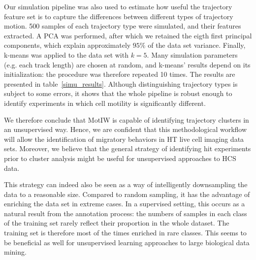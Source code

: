 Our simulation pipeline was also used to estimate how useful the trajectory feature set is to capture the differences between different types of trajectory motion. %
500 samples of each trajectory type were simulated, and their features
extracted. A PCA was performed, after which we retained the eigth
first principal components, which explain approximately $95\%$ of the
data set variance. Finally, k-means was applied to the data set with
$k=5$. Many simulation parameters (e.g. each track length) are chosen
at random, and k-means' results depend on its initialization: the
procedure was therefore repeated 10 times. The results are presented
in table~\ref{simu_results}. Although distinguishing trajectory types
is subject to some errors, it shows that the whole pipeline is robust
enough to identify experiments in which cell motility is significantly
different. 

We therefore conclude that MotIW is capable of identifying trajectory
clusters in an unsupervised way. Hence, we are confident that this
methodological workflow will allow the identification of migratory behaviors in HT live cell imaging data sets. Moreover, we believe that the general strategy of identifying hit experiments prior to cluster analysis
might be useful for unsupervised approaches to HCS data. 

This strategy can indeed also be seen as a way of intelligently downsampling the data to a reasonable size. Compared to random sampling, it has the advantage of enriching the data set in extreme cases. In a supervised setting, this occurs as a natural result from the annotation process: the numbers of samples in each class of the training set rarely reflect their proportion in the whole dataset. The training set is therefore most of the times enriched in rare classes. This seems to be beneficial as well for unsupervised learning approaches to large biological data mining.



